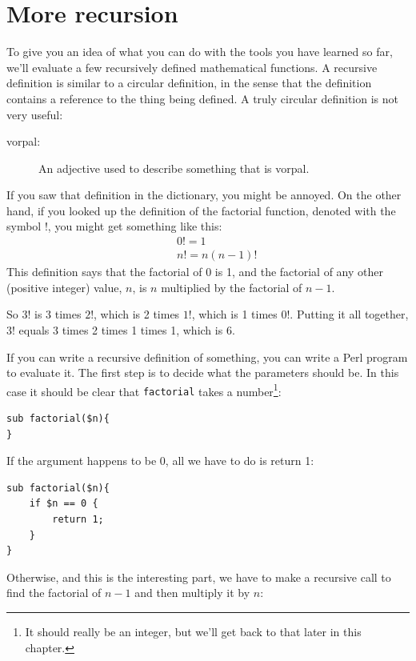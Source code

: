 \section{More recursion}
\label{more.recursion}


To give you an idea of what you can do with the tools you have learned
so far, we'll evaluate a few recursively defined mathematical
functions.  A recursive definition is similar to a circular
definition, in the sense that the definition contains a reference to
the thing being defined.  A truly circular definition is not very
useful:

\begin{description}

\item[vorpal:] An adjective used to describe something that is vorpal.

\end{description}

If you saw that definition in the dictionary, you might be annoyed. On
the other hand, if you looked up the definition of the factorial
function, denoted with the symbol $!$, you might get something like
this:
%
\begin{eqnarray*}
&&  0! = 1 \\
&&  n! = n (n-1)!
\end{eqnarray*}
%
This definition says that the factorial of 0 is 1, and the 
factorial of any other (positive integer) value, $n$, is 
$n$ multiplied by the factorial of $n-1$.

So $3!$ is 3 times $2!$, which is 2 times $1!$, which is 1 times
$0!$. Putting it all together, $3!$ equals 3 times 2 times 1 times 1,
which is 6.

If you can write a recursive definition of something, you can
write a Perl program to evaluate it. The first step is to decide
what the parameters should be.  In this case it should be clear
that {\tt factorial} takes a number\footnote{It should really be an 
integer, but we'll get back to that later in this chapter.}:

\begin{verbatim}
sub factorial($n){
}
\end{verbatim}
%
If the argument happens to be 0, all we have to do is return 1:

\begin{verbatim}
sub factorial($n){
    if $n == 0 {
        return 1;
    }
}   
\end{verbatim}
%
Otherwise, and this is the interesting part, we have to make a
recursive call to find the factorial of $n-1$ and then 
multiply it by $n$:

